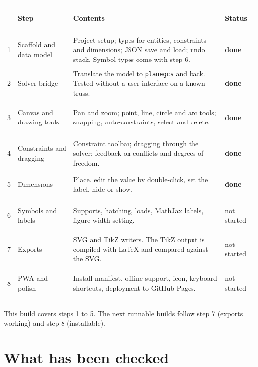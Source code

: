 \documentclass[10pt,a4paper]{article}
\newcommand{\code}[1]{\texttt{#1}}
\newcommand{\sdone}{\textcolor{done}{\textbf{done}}}
\newcommand{\stodo}{\textcolor{todo}{not started}}
\begin{document}
\begin{tabularx}{\textwidth}{@{}c>{\bfseries\raggedright\arraybackslash}p{31mm}Lp{17mm}@{}}
\toprule
& Step & Contents & Status \\
 & Scaffold and data model & Project setup; types for entities, constraints and dimensions; JSON save and load; undo stack. Symbol types come with step 6. & \sdone \\
2 & Solver bridge & Translate the model to \code{planegcs} and back. Tested without a user interface on a known truss. & \sdone \\
3 & Canvas and drawing tools & Pan and zoom; point, line, circle and arc tools; snapping; auto-constraints; select and delete. & \sdone \\
4 & Constraints and dragging & Constraint toolbar; dragging through the solver; feedback on conflicts and degrees of freedom. & \sdone \\
5 & Dimensions & Place, edit the value by double-click, set the label, hide or show. & \sdone \\
6 & Symbols and labels & Supports, hatching, loads, MathJax labels, figure width setting. & \stodo \\
7 & Exports & SVG and TikZ writers. The TikZ output is compiled with \LaTeX{} and compared against the SVG. & \stodo \\
8 & PWA and polish & Install manifest, offline support, icon, keyboard shortcuts, deployment to GitHub Pages. & \stodo \\
\bottomrule
\end{tabularx}

This build covers steps 1 to 5. The next runnable builds follow step 7
(exports working) and step 8 (installable).

\section{What has been checked}\label{sec:verified}
\end{document}
